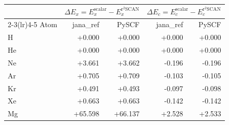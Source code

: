 \begin{tabular}{@{}lrrrr@{}}
\toprule
 & \multicolumn{2}{c}{$\Delta E_x=E_x^{\mathrm{scalar}}-E_x^{\mathrm{r^2SCAN}}$} & \multicolumn{2}{c}{$\Delta E_c=E_c^{\mathrm{scalar}}-E_c^{\mathrm{r^2SCAN}}$} \\
\cmidrule(lr){2-3}\cmidrule(lr){4-5}
Atom & jana\_ref & PySCF & jana\_ref & PySCF \\
\midrule
H & +0.000 & \textcolor{pyscfred}{+0.000} & +0.000 & \textcolor{pyscfred}{+0.000} \\
He & +0.000 & \textcolor{pyscfred}{+0.000} & +0.000 & \textcolor{pyscfred}{+0.000} \\
Ne & +3.661 & \textcolor{pyscfred}{+3.662} & -0.196 & \textcolor{pyscfred}{-0.196} \\
Ar & +0.705 & \textcolor{pyscfred}{+0.709} & -0.103 & \textcolor{pyscfred}{-0.105} \\
Kr & +0.491 & \textcolor{pyscfred}{+0.493} & -0.097 & \textcolor{pyscfred}{-0.098} \\
Xe & +0.663 & \textcolor{pyscfred}{+0.663} & -0.142 & \textcolor{pyscfred}{-0.142} \\
Mg & +65.598 & \textcolor{pyscfred}{+66.137} & +2.528 & \textcolor{pyscfred}{+2.533} \\
\bottomrule
\end{tabular}

